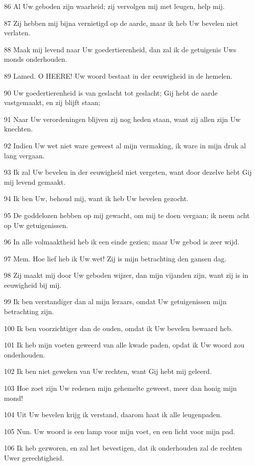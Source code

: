 \par 86 Al Uw geboden zijn waarheid; zij vervolgen mij met leugen, help mij.
\par 87 Zij hebben mij bijna vernietigd op de aarde, maar ik heb Uw bevelen niet verlaten.
\par 88 Maak mij levend naar Uw goedertierenheid, dan zal ik de getuigenis Uws monds onderhouden.
\par 89 Lamed. O HEERE! Uw woord bestaat in der eeuwigheid in de hemelen.
\par 90 Uw goedertierenheid is van geslacht tot geslacht; Gij hebt de aarde vastgemaakt, en zij blijft staan;
\par 91 Naar Uw verordeningen blijven zij nog heden staan, want zij allen zijn Uw knechten.
\par 92 Indien Uw wet niet ware geweest al mijn vermaking, ik ware in mijn druk al lang vergaan.
\par 93 Ik zal Uw bevelen in der eeuwigheid niet vergeten, want door dezelve hebt Gij mij levend gemaakt.
\par 94 Ik ben Uw, behoud mij, want ik heb Uw bevelen gezocht.
\par 95 De goddelozen hebben op mij gewacht, om mij te doen vergaan; ik neem acht op Uw getuigenissen.
\par 96 In alle volmaaktheid heb ik een einde gezien; maar Uw gebod is zeer wijd.
\par 97 Mem. Hoe lief heb ik Uw wet! Zij is mijn betrachting den gansen dag.
\par 98 Zij maakt mij door Uw geboden wijzer, dan mijn vijanden zijn, want zij is in eeuwigheid bij mij.
\par 99 Ik ben verstandiger dan al mijn leraars, omdat Uw getuigenissen mijn betrachting zijn.
\par 100 Ik ben voorzichtiger dan de ouden, omdat ik Uw bevelen bewaard heb.
\par 101 Ik heb mijn voeten geweerd van alle kwade paden, opdat ik Uw woord zou onderhouden.
\par 102 Ik ben niet geweken van Uw rechten, want Gij hebt mij geleerd.
\par 103 Hoe zoet zijn Uw redenen mijn gehemelte geweest, meer dan honig mijn mond!
\par 104 Uit Uw bevelen krijg ik verstand, daarom haat ik alle leugenpaden.
\par 105 Nun. Uw woord is een lamp voor mijn voet, en een licht voor mijn pad.
\par 106 Ik heb gezworen, en zal het bevestigen, dat ik onderhouden zal de rechten Uwer gerechtigheid.
